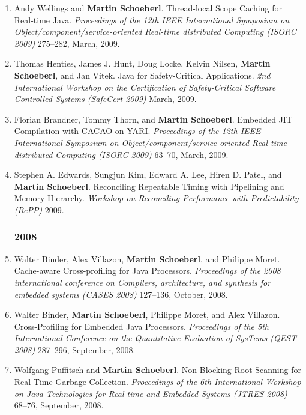 \begin{enumerate}
\item Andy Wellings and {\bf Martin Schoeberl}.
 Thread-local Scope Caching for Real-time Java.
 \emph{Proceedings of the 12th IEEE International Symposium on Object/component/service-oriented Real-time distributed Computing (ISORC 2009)} 275--282, March, 2009.

\item Thomas Henties, James J. Hunt, Doug Locke, Kelvin Nilsen, {\bf Martin Schoeberl}, and Jan Vitek.
 Java for Safety-Critical Applications.
 \emph{2nd International Workshop on the Certification of Safety-Critical Software Controlled Systems (SafeCert 2009)} March, 2009.

\item Florian Brandner, Tommy Thorn, and {\bf Martin Schoeberl}.
 Embedded JIT Compilation with CACAO on YARI.
 \emph{Proceedings of the 12th IEEE International Symposium on Object/component/service-oriented Real-time distributed Computing (ISORC 2009)} 63--70, March, 2009.

\item Stephen A. Edwards, Sungjun Kim, Edward A. Lee, Hiren D. Patel, and {\bf Martin Schoeberl}.
 Reconciling Repeatable Timing with Pipelining and Memory Hierarchy.
 \emph{Workshop on Reconciling Performance with Predictability (RePP)} 2009.


\subsubsection*{2008}

\item Walter Binder, Alex Villazon, {\bf Martin Schoeberl}, and Philippe Moret.
 Cache-aware Cross-profiling for Java Processors.
 \emph{Proceedings of the 2008 international conference on Compilers, architecture, and synthesis for embedded systems (CASES 2008)} 127--136, October, 2008.

\item Walter Binder, {\bf Martin Schoeberl}, Philippe Moret, and Alex Villazon.
 Cross-Profiling for Embedded Java Processors.
 \emph{Proceedings of the 5th International Conference on the Quantitative Evaluation of SysTems (QEST 2008)} 287--296, September, 2008.

\item Wolfgang Puffitsch and {\bf Martin Schoeberl}.
 Non-Blocking Root Scanning for Real-Time Garbage Collection.
 \emph{Proceedings of the 6th International Workshop on Java Technologies for Real-time and Embedded Systems (JTRES 2008)} 68--76, September, 2008.


\end{enumerate}
